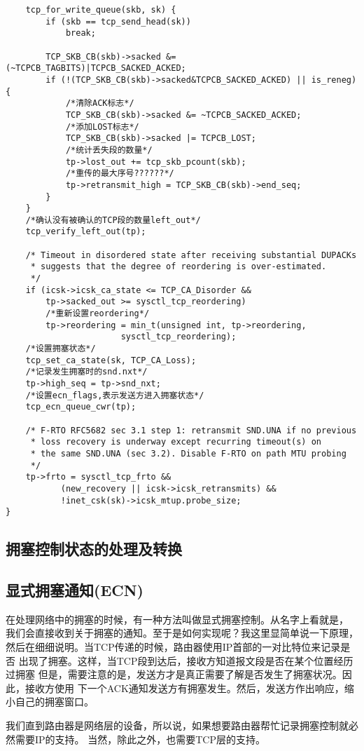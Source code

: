 \begin{verbatim}
	tcp_for_write_queue(skb, sk) {
		if (skb == tcp_send_head(sk))
			break;

		TCP_SKB_CB(skb)->sacked &= (~TCPCB_TAGBITS)|TCPCB_SACKED_ACKED;
		if (!(TCP_SKB_CB(skb)->sacked&TCPCB_SACKED_ACKED) || is_reneg) {
			/*清除ACK标志*/
			TCP_SKB_CB(skb)->sacked &= ~TCPCB_SACKED_ACKED;
			/*添加LOST标志*/			
			TCP_SKB_CB(skb)->sacked |= TCPCB_LOST;
			/*统计丢失段的数量*/			
			tp->lost_out += tcp_skb_pcount(skb);
			/*重传的最大序号??????*/
			tp->retransmit_high = TCP_SKB_CB(skb)->end_seq;
		}
	}
	/*确认没有被确认的TCP段的数量left_out*/
	tcp_verify_left_out(tp);

	/* Timeout in disordered state after receiving substantial DUPACKs
	 * suggests that the degree of reordering is over-estimated.
	 */
	if (icsk->icsk_ca_state <= TCP_CA_Disorder &&
	    tp->sacked_out >= sysctl_tcp_reordering)
		/*重新设置reordering*/
		tp->reordering = min_t(unsigned int, tp->reordering,
				       sysctl_tcp_reordering);
	/*设置拥塞状态*/	
	tcp_set_ca_state(sk, TCP_CA_Loss);
	/*记录发生拥塞时的snd.nxt*/
	tp->high_seq = tp->snd_nxt;
	/*设置ecn_flags,表示发送方进入拥塞状态*/	
	tcp_ecn_queue_cwr(tp);

	/* F-RTO RFC5682 sec 3.1 step 1: retransmit SND.UNA if no previous
	 * loss recovery is underway except recurring timeout(s) on
	 * the same SND.UNA (sec 3.2). Disable F-RTO on path MTU probing
	 */
	tp->frto = sysctl_tcp_frto &&
		   (new_recovery || icsk->icsk_retransmits) &&
		   !inet_csk(sk)->icsk_mtup.probe_size;
}
\end{verbatim}
	\subsection{拥塞控制状态的处理及转换}
		
	\subsection{显式拥塞通知(ECN)}
		在处理网络中的拥塞的时候，有一种方法叫做显式拥塞控制。从名字上看就是，
		我们会直接收到关于拥塞的通知。至于是如何实现呢？我这里显简单说一下原理，
		然后在细细说明。当TCP传递的时候，路由器使用IP首部的一对比特位来记录是否
		出现了拥塞。这样，当TCP段到达后，接收方知道报文段是否在某个位置经历过拥塞
		但是，需要注意的是，发送方才是真正需要了解是否发生了拥塞状况。因此，接收方使用
		下一个ACK通知发送方有拥塞发生。然后，发送方作出响应，缩小自己的拥塞窗口。

		我们直到路由器是网络层的设备，所以说，如果想要路由器帮忙记录拥塞控制就必然需要IP的支持。
		当然，除此之外，也需要TCP层的支持。

